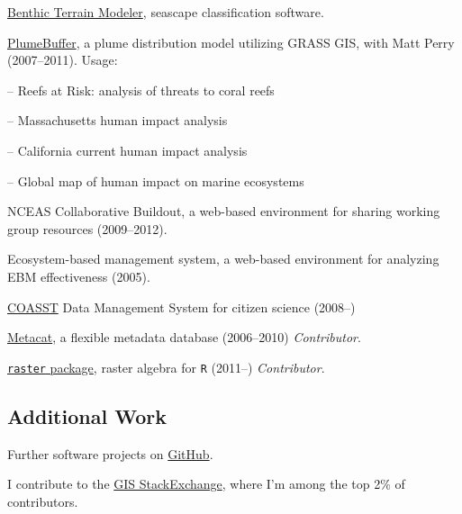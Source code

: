 \documentclass[letterpaper]{article}
\renewenvironment{itemize}{
  \begin{list}{}{
    \setlength{\leftmargin}{1.5em}
  }
}{
  \end{list}
}
\begin{document}
\begin{itemize}
\item \href{https://github.com/EsriOceans/btm}{Benthic Terrain Modeler}, seascape classification software.
\item \href{https://github.com/scw/global-marine-threats/}{PlumeBuffer}, a plume distribution model utilizing GRASS GIS, with Matt Perry (2007--2011). Usage:
  \begin{itemize}
    \item -- Reefs at Risk: analysis of threats to coral reefs
    \item -- Massachusetts human impact analysis
    \item -- California current human impact analysis
    \item -- Global map of human impact on marine ecosystems
  \end{itemize}
\item NCEAS Collaborative Buildout, a web-based environment for sharing working group resources (2009--2012).
\item Ecosystem-based management system, a web-based environment for analyzing EBM effectiveness (2005).
\item \href{http://depts.washington.edu/coasst/}{COASST} Data Management System for citizen science (2008--)
\item \href{http://knb.ecoinformatics.org/software/metacat/}{Metacat}, a flexible metadata database (2006--2010) {\it Contributor}.
\item \href{http://cran.r-project.org/web/packages/raster/}{\texttt{raster} package}, raster algebra for \texttt{R} (2011--) {\it Contributor}.
\end{itemize}

\subsection*{Additional Work}
\begin{itemize}
  \item Further software projects on \href{http://github.com/scw}{GitHub}.
  \item I contribute to the \href{http://gis.stackexchange.com}{GIS StackExchange}, where I'm among the top 2\% of contributors.

\end{itemize}

\bigskip
\end{document}
